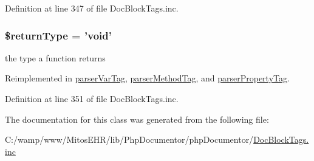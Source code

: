\-Definition at line 347 of file \-Doc\-Block\-Tags.\-inc.

\hypertarget{classparser_return_tag_a0f317c2c1d4c617554890223a39037be}{
\subsubsection[{\$return\-Type}]{\setlength{\rightskip}{0pt plus 5cm}\$return\-Type = 'void'}}\label{classparser_return_tag_a0f317c2c1d4c617554890223a39037be}
the type a function returns 

\-Reimplemented in \hyperlink{classparser_var_tag_a0f317c2c1d4c617554890223a39037be}{parser\-Var\-Tag}, \hyperlink{classparser_method_tag_a0f317c2c1d4c617554890223a39037be}{parser\-Method\-Tag}, and \hyperlink{classparser_property_tag_a0f317c2c1d4c617554890223a39037be}{parser\-Property\-Tag}.



\-Definition at line 351 of file \-Doc\-Block\-Tags.\-inc.



\-The documentation for this class was generated from the following file\-:\begin{DoxyCompactItemize}
\item 
\-C\-:/wamp/www/\-Mitos\-E\-H\-R/lib/\-Php\-Documentor/php\-Documentor/\hyperlink{_doc_block_tags_8inc}{\-Doc\-Block\-Tags.\-inc}\end{DoxyCompactItemize}
